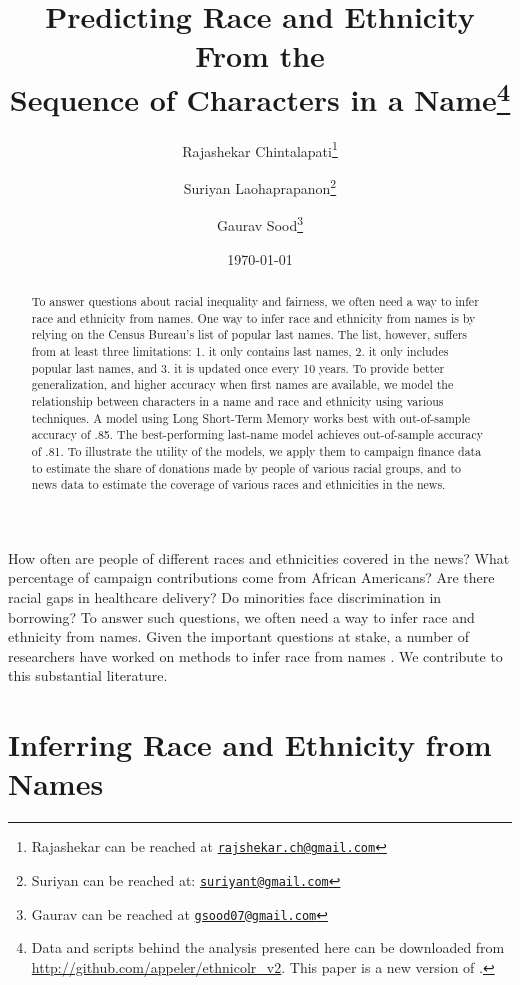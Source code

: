 \documentclass[12pt, letterpaper]{article}
\title{\Large{Predicting Race and Ethnicity From the\\Sequence of Characters in a Name}\footnote{Data and scripts behind the analysis presented here can be downloaded from \url{http://github.com/appeler/ethnicolr_v2}. This paper is a new version of \citet{sood2018predicting}.}}
\author{Rajashekar Chintalapati\thanks{Rajashekar can be reached at \href{mailto:rajshekar.ch@gmail.com}\texttt{rajshekar.ch@gmail.com}} 
\and Suriyan Laohaprapanon\thanks{Suriyan can be reached at: \href{mailto:suriyant@gmail.com}\texttt{suriyant@gmail.com}}
\and Gaurav Sood\thanks{Gaurav can be reached at \href{mailto:gsood07@gmail.com}\texttt{gsood07@gmail.com}}}
\date{\vspace{.5cm}\normalsize{\today}}
\begin{document}
\maketitle

\begin{abstract}
To answer questions about racial inequality and fairness, we often need a way to infer race and ethnicity from names. One way to infer race and ethnicity from names is by relying on the Census Bureau's list of popular last names. The list, however, suffers from at least three limitations: 1. it only contains last names, 2. it only includes popular last names, and 3. it is updated once every 10 years. To provide better generalization, and higher accuracy when first names are available, we model the relationship between characters in a name and race and ethnicity using various techniques. A model using Long Short-Term Memory works best with out-of-sample accuracy of .85. The best-performing last-name model achieves out-of-sample accuracy of .81. To illustrate the utility of the models, we apply them to campaign finance data to estimate the share of donations made by people of various racial groups, and to news data to estimate the coverage of various races and ethnicities in the news.
\end{abstract}
\clearpage
\doublespace

How often are people of different races and ethnicities covered in the news? What percentage of campaign contributions come from African Americans? Are there racial gaps in healthcare delivery? Do minorities face discrimination in borrowing? To answer such questions, we often need a way to infer race and ethnicity from names. Given the important questions at stake, a number of researchers have worked on methods to infer race from names \citep[see, e.g.,][]{ambekar2009name, fiscella2006use, imai2016improving, rosenman2022race}. We contribute to this substantial literature.

\section*{Inferring Race and Ethnicity from Names}
\end{document}
